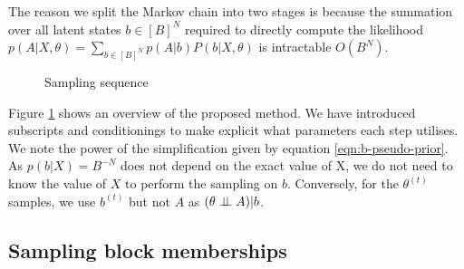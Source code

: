 The reason we split the Markov chain into two stages is because the summation over all latent states $b \in [B]^N$ required to directly compute the likelihood $p(A| X, \theta) = \sum_{b \in [B]^N} p(A | b) P(b | X, \theta)$ is intractable $O(B^N)$.
%
\begin{figure}[!h]
	\centering
	\caption{Sampling sequence}
	\label{fig:samp-sequence}
\end{figure}
%
Figure \ref{fig:samp-sequence} shows an overview of the proposed method. We have introduced subscripts and conditionings to make explicit what parameters each step utilises. We note the power of the simplification given by equation \ref{eqn:b-pseudo-prior}. As $p(b| X) = B^{-N}$ does not depend on the exact value of X, we do not need to know the value of $X$ to perform the sampling on $b$. Conversely, for the $\theta^{(t)}$ samples, we use $b^{(t)}$ but not $A$ as $(\theta \perp \!\!\! \perp A) | b$.

\subsection{Sampling block memberships}

